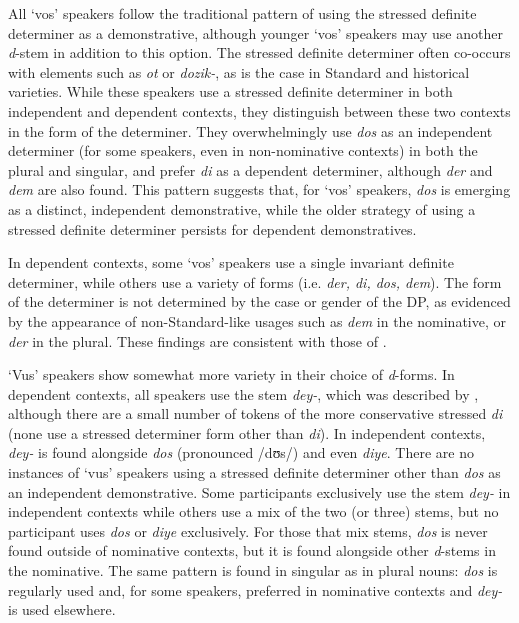 \documentclass[output=paper, hidelinks]{langscibook}
\begin{document}
All `vos' speakers follow the traditional pattern of using the stressed definite determiner as a demonstrative, although younger `vos' speakers may use another \textit{d}-stem in addition to this option. The stressed definite determiner often co-occurs with elements such as \textit{ot} or \textit{dozik-}, as is the case in Standard and historical varieties. While these speakers use a stressed definite determiner in both independent and dependent contexts, they distinguish between these two contexts in the form of the determiner. They overwhelmingly use \textit{dos} as an independent determiner (for some speakers, even in non-nominative contexts) in both the plural and singular, and prefer \textit{di} as a dependent determiner, although \textit{der} and \textit{dem} are also found. This pattern suggests that, for `vos' speakers, \textit{dos} is emerging as a distinct, independent demonstrative, while the older strategy of using a stressed definite determiner persists for dependent demonstratives. 

In dependent contexts, some `vos' speakers use a single invariant definite determiner, while others use a variety of forms (i.e. \textit{der, di, dos, dem}). The form of the determiner is not determined by the case or gender of the DP, as evidenced by the appearance of non-Standard-like usages such as \textit{dem} in the nominative, or \textit{der} in the plural. These findings are consistent with those of \citet{Author21}.

`Vus' speakers show somewhat more variety in their choice of \textit{d}-forms. In dependent contexts, all speakers use the stem \textit{dey-}, which was described by \citet{Krogh12, Assouline14, Sadock18}, although there are a small number of tokens of the more conservative stressed \textit{di} (none use a stressed determiner form other than \textit{di}). In independent contexts, \textit{dey-} is found alongside \textit{dos} (pronounced /dʊs/) and even \textit{diye}. There are no instances of `vus' speakers using a stressed definite determiner other than \textit{dos} as an independent demonstrative. Some participants exclusively use the stem \textit{dey-} in independent contexts while others use a mix of the two (or three) stems, but no participant uses \textit{dos} or \textit{diye} exclusively. For those that mix stems, \textit{dos} is never found outside of nominative contexts, but it is found alongside other \textit{d}-stems in the nominative. The same pattern is found in singular as in plural nouns: \textit{dos} is regularly used and, for some speakers, preferred in nominative contexts and \textit{dey-} is used elsewhere. 
\end{document}
